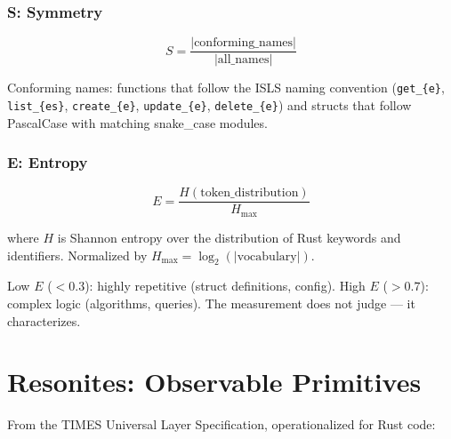 \documentclass[11pt,a4paper]{article}
\begin{document}
\subsubsection{S: Symmetry}

\begin{equation}
S = \frac{|\text{conforming\_names}|}{|\text{all\_names}|}
\end{equation}

Conforming names: functions that follow the ISLS naming 
convention (\texttt{get\_\{e\}}, \texttt{list\_\{es\}}, 
\texttt{create\_\{e\}}, \texttt{update\_\{e\}}, 
\texttt{delete\_\{e\}}) and structs that follow PascalCase 
with matching snake\_case modules.

\subsubsection{E: Entropy}

\begin{equation}
E = \frac{H(\text{token\_distribution})}{H_\text{max}}
\end{equation}

where $H$ is Shannon entropy over the distribution of 
Rust keywords and identifiers. Normalized by $H_\text{max} = 
\log_2(|\text{vocabulary}|)$.

Low $E$ ($< 0.3$): highly repetitive (struct definitions, config). 
High $E$ ($> 0.7$): complex logic (algorithms, queries). 
The measurement does not judge --- it characterizes.


\section{Resonites: Observable Primitives}
\label{sec:resonites}

From the TIMES Universal Layer Specification, operationalized 
for Rust code:
\end{document}
